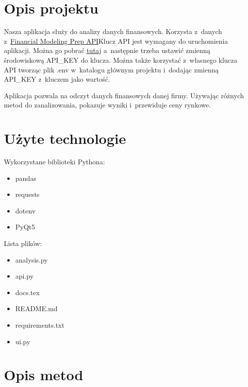 \documentclass[12pt]{article}
\begin{document}
    \maketitle
    \tableofcontents
    \newpage


    \section{Opis projektu}\label{sec:opis-projektu}
    Nasza aplikacja służy do analizy danych finansowych.
    Korzysta z~danych
	z~\underline{\href{https://site.financialmodelingprep.com/developer/docs/}{Financial Modeling Prep API}}\.
    Klucz API jest wymagany do uruchomienia aplikacji.
    Można go pobrać \underline{\href{https://site.financialmodelingprep.com/login}{tutaj}} a~następnie
    trzeba ustawić zmienną środowiskową API\_KEY do klucza.
    Można także korzystać z~własnego klucza API tworząc plik .env w~katalogu głównym projektu
    i~dodając zmienną API\_KEY z~kluczem jako wartość.

    Aplikacja pozwala na odczyt danych finansowych danej firmy.
    Używając różnych metod do zanalizowania, pokazuje wyniki i~przewiduje ceny rynkowe.


    \section{Użyte technologie}\label{sec:uzyte-echnologie}

    Wykorzystane biblioteki Pythona:
    \begin{itemize}
        \item pandas
        \item requests
        \item dotenv
        \item PyQt5
    \end{itemize}

    Lista plików:
    \begin{itemize}
        \item analysis.py
        \item api.py
        \item docs.tex
        \item README.md
        \item requirements.txt
        \item ui.py
    \end{itemize}


    \section{Opis metod}\label{sec:uzyte-metody}
\end{document}
